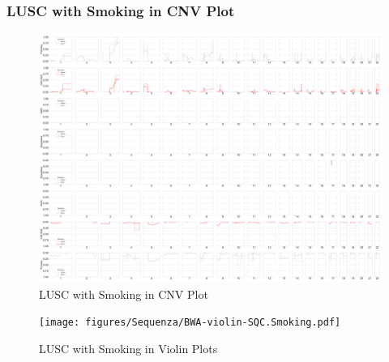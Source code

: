 \documentclass{beamer}
\begin{document}
    \begin{frame}[allowframebreaks]
        \frametitle{LUSC with Smoking in CNV Plot}

        \begin{figure}
            \includegraphics[width=0.6 \linewidth]{figures/Sequenza/BWA-simple-SQC.Smoking.pdf}
            \caption{LUSC with Smoking in CNV Plot}
        \end{figure}

        \begin{figure}
            \texttt{[image: figures/Sequenza/BWA-violin-SQC.Smoking.pdf]}
            \caption{LUSC with Smoking in Violin Plots}
        \end{figure}
    \end{frame}
\end{document}
